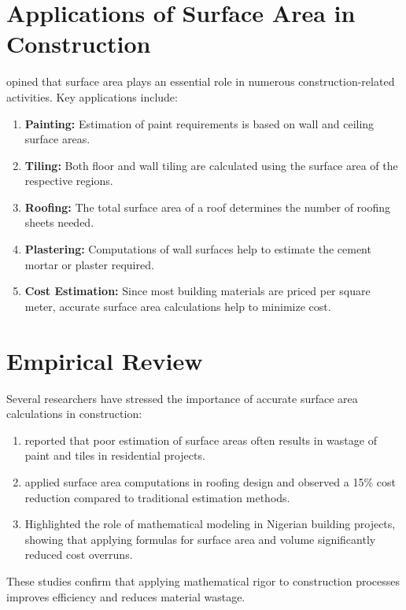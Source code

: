 \documentclass[12pt,a4paper,openany,titlepage,reqno, final]{report}
\theoremstyle{definition}
\begin{document}
	\section{Applications of Surface Area in Construction} \cite{oladipo2016} opined that surface area plays an essential role in numerous construction-related activities. Key applications include:
	
	\begin{enumerate} \item \textbf{Painting:} Estimation of paint requirements is based on wall and ceiling surface areas. \item \textbf{Tiling:} Both floor and wall tiling are calculated using the surface area of the respective regions. \item \textbf{Roofing:} The total surface area of a roof determines the number of roofing sheets needed. \item \textbf{Plastering:} Computations of wall surfaces help to estimate the cement mortar or plaster required. \item \textbf{Cost Estimation:} Since most building materials are priced per square meter, accurate surface area calculations help to minimize cost. \end{enumerate}
	
	\section{Empirical Review} Several researchers have stressed the importance of accurate surface area calculations in construction:
	
	\begin{enumerate} \item \cite{adebayo2016} reported that poor estimation of surface areas often results in wastage of paint and tiles in residential projects. \item \cite{akinyemi2018} applied surface area computations in roofing design and observed a 15\% cost reduction compared to traditional estimation methods. \item \cite{lawal2020} Highlighted the role of mathematical modeling in Nigerian building projects, showing that applying formulas for surface area and volume significantly reduced cost overruns. \end{enumerate}
	
	These studies confirm that applying mathematical rigor to construction processes improves efficiency and reduces material wastage.
	
\end{document}
